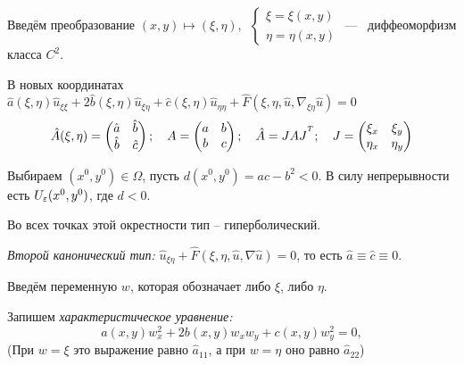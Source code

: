 \documentclass[../main.tex]{subfiles}
\begin{document}
Введём преобразование 
$ (x,y) \mapsto (\xi, \eta),\;\ 
\begin{cases}
  \xi  = \xi(x, y) \\
  \eta = \eta(x, y)
\end{cases}$%
--- \ диффеоморфизм класса $C^2$.

В новых координатах \ 
$\hat{a}(\xi,\eta) \hat{u}_{\xi\xi}   +
2\hat{b}(\xi,\eta) \hat{u}_{\xi\eta}  +
 \hat{c}(\xi,\eta) \hat{u}_{\eta\eta} +
\hat{F}(\xi,\eta,\hat{u},\nabla_{\xi\eta}\hat{u}) = 0$
%
$$\hat{A}(\xi, \eta) = 
\begin{pmatrix}
  \hat{a} & \hat{b} \\
  \hat{b} & \hat{c}
\end{pmatrix}; 
%
\quad A = 
\begin{pmatrix}
  a & b \\
  b & c
\end{pmatrix};
%
\quad \hat{A} = JAJ^\Transp;
\quad J = 
\begin{pmatrix}
  \xi_x  & \xi_y \\
  \eta_x & \eta_y
\end{pmatrix}$$



Выбираем $(x^0, y^0) \in \Omega$, 
пусть $d(x^0, y^0) = ac - b^2 < 0$. 
В силу непрерывности есть $U_\varepsilon(x^0, y^0)$, где $d < 0$.

Во всех точках этой окрестности тип -- гиперболический.

\begin{definition}
\textit{Второй канонический тип:} 
$\hat{u}_{\xi\eta} + \hat{F}(\xi,\eta,\hat{u},\nabla\hat{u}) = 0$, 
то есть $\hat{a} \equiv \hat{c} \equiv 0$.
\end{definition}

Введём переменную $w$, которая обозначает либо $\xi$, либо $\eta$.

Запишем \textit{характеристическое уравнение:}
$$
a(x,y)w_x^2 + 2b(x,y) w_x w_y + c(x,y)w_y^2 = 0, 
$$
(При  $w = \xi$ это выражение равно $\hat{a}_{11}$, 
а при $w = \eta$ оно равно $\hat{a}_{22}$)
\end{document}
